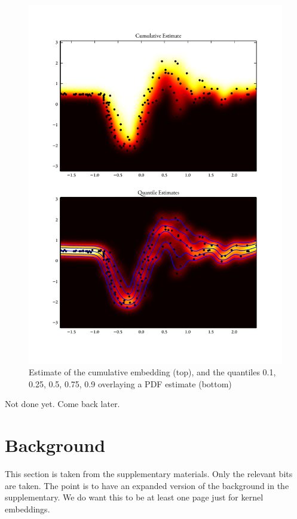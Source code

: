 \documentclass[twoside]{article} \usepackage{aistats2017}
\theoremstyle{definition}
\newcommand{\warn}[1]{{\color{red} #1}}
\begin{document}
	\begin{figure}
		\begin{center}
			\includegraphics[width=\columnwidth]{figures/mcquantiles}
		\end{center}
		\caption{\small Estimate of the cumulative embedding (top),
			and the quantiles 0.1, 0.25, 0.5, 0.75, 0.9 overlaying a PDF estimate
			(bottom)}
		\label{fig:cembedding}
	\end{figure}

	\warn{Not done yet. Come back later.}
	
\section{Background}
\label{sec:background}
	
	\warn{This section is taken from the supplementary materials. Only the relevant bits are taken. The point is to have an expanded version of the background in the supplementary. We do want this to be at least one page just for kernel embeddings.}
	
\end{document}
